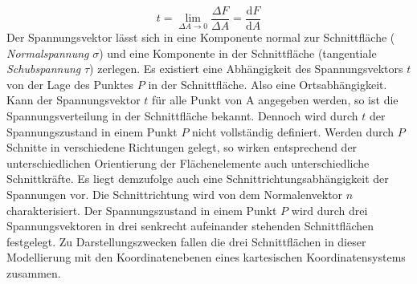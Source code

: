 \documentclass[12pt,a4paper,parskip]{scrartcl}
\begin{document}
{\begin{equation}
   t = \lim \limits_{\Delta A \to 0} \frac{\Delta F}{\Delta A} = \frac{\text{d}F}{\text{d}A}  
   \end{equation}
Der Spannungsvektor lässt sich in eine Komponente normal zur Schnittfläche ( \emph{Normalspannung} $ \sigma $) und eine Komponente in der Schnittfläche (tangentiale \emph{Schubspannung} $ \tau $) zerlegen. Es existiert eine Abhängigkeit des Spannungsvektors $ t $ von der Lage des Punktes $ P $ in der Schnittfläche. Also eine Ortsabhängigkeit. Kann der Spannungsvektor $ t $ für alle Punkt von A angegeben werden, so ist die Spannungsverteilung in der Schnittfläche bekannt. Dennoch wird durch $ t $ der Spannungszustand in einem Punkt $ P $ nicht vollständig definiert. Werden durch $ P $ Schnitte in verschiedene Richtungen gelegt, so wirken entsprechend der unterschiedlichen Orientierung der Flächenelemente auch unterschiedliche Schnittkräfte. Es liegt demzufolge auch eine Schnittrichtungsabhängigkeit der Spannungen vor. Die Schnittrichtung wird von dem Normalenvektor $ n $ charakterisiert. Der Spannungszustand in einem Punkt $ P $ wird durch drei Spannungsvektoren in drei senkrecht aufeinander stehenden Schnittflächen festgelegt. Zu Darstellungszwecken fallen die drei Schnittflächen in dieser Modellierung mit den Koordinatenebenen eines kartesischen Koordinatensystems zusammen.

}
\end{document}
